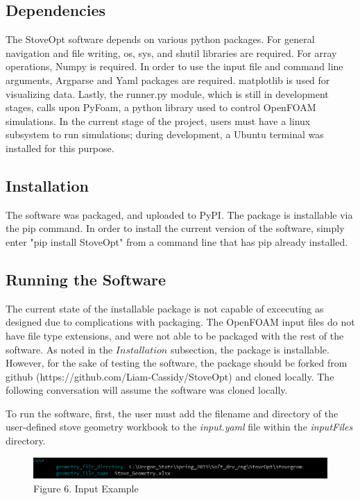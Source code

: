 \documentclass[3p,times,twocolumn]{elsarticle}
\begin{document}
\subsection{Dependencies}
The StoveOpt software depends on various python packages. For general navigation and file writing, os, sys, and shutil libraries are required. For array operations, Numpy is required. In order to use the input file and command line arguments, Argparse and Yaml packages are required. matplotlib is used for visualizing data. Lastly, the runner.py module, which is still in development stages, calls upon PyFoam, a python library used to control OpenFOAM simulations. In the current stage of the project, users must have a linux subsystem to run simulations; during development, a Ubuntu terminal was installed for this purpose.


\subsection{Installation}

The software was packaged, and uploaded to PyPI. The package is installable via the pip command. In order to install the current version of the software, simply enter "pip install StoveOpt" from a command line that has pip already installed. 

\subsection{Running the Software}
The current state of the installable package is not capable of excecuting as designed due to complications with packaging. The OpenFOAM input files do not have file type extensions, and were not able to be packaged with the rest of the software. As noted in the $\textit{Installation}$ subsection, the package is installable. However, for the sake of testing the software, the package should be forked from github (https://github.com/Liam-Cassidy/StoveOpt) and cloned locally. The following conversation will assume the software was cloned locally.

To run the software, first, the user must add the filename and directory of the user-defined stove geometry workbook to the \textit{input.yaml} file within the \textit{inputFiles} directory.

\begin{figure}
	\includegraphics[width=\linewidth]{inputyamlex.PNG}
	\caption{Figure 6. Input Example}
\end{figure}
\end{document}

